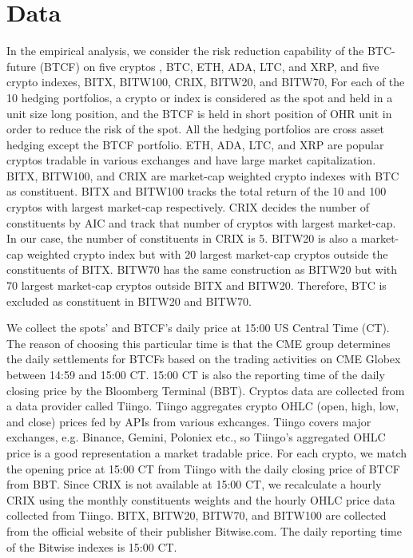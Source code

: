 \section{Data}\label{subsec:data}
In the empirical analysis, we consider the risk reduction capability of the BTC-future (BTCF) on five cryptos
, BTC, ETH, ADA, LTC, and XRP, and five crypto indexes, BITX, BITW100, CRIX, BITW20, and BITW70,
For each of the 10 hedging portfolios, a crypto or index is considered as the spot and held in a unit size long position,
and the BTCF is held in short position of OHR unit in order to reduce the risk of the spot.
All the hedging portfolios are cross asset hedging except the BTCF portfolio.
ETH, ADA, LTC, and XRP are popular cryptos tradable in various exchanges and have large market capitalization.
BITX, BITW100, and CRIX are market-cap weighted crypto indexes with BTC as constituent.
BITX and BITW100 tracks the total return of the 10 and 100 cryptos with largest market-cap respectively.
CRIX decides the number of constituents by AIC and track that number of cryptos with largest market-cap.
In our case, the number of constituents in CRIX is 5.
BITW20 is also a market-cap weighted crypto index but with 20 largest market-cap cryptos outside the constituents of
BITX.
BITW70 has the same construction as BITW20 but with 70 largest market-cap cryptos outside BITX and BITW20.
Therefore, BTC is excluded as constituent in BITW20 and BITW70. \medskip

We collect the spots' and BTCF's daily price at 15:00 US Central Time (CT).
The reason of choosing this particular time is that the CME group determines the daily settlements for BTCFs based on the trading activities on CME Globex between 14:59 and 15:00 CT.
15:00 CT is also the reporting time of the daily closing price by the Bloomberg Terminal (BBT).
Cryptos data are collected from a data provider called Tiingo.
Tiingo aggregates crypto OHLC (open, high, low, and close) prices fed by APIs from various exhcanges.
Tiingo covers major exchanges, e.g. Binance, Gemini, Poloniex etc., so Tiingo's aggregated OHLC price is a good representation a market tradable price.
For each crypto, we match the opening price at 15:00 CT from Tiingo with the daily closing price of BTCF from BBT.
Since CRIX is not available at 15:00 CT, we recalculate a hourly CRIX using the monthly constituents weights and the hourly OHLC price data collected from Tiingo.
BITX, BITW20, BITW70, and BITW100 are collected from the official website of their publisher Bitwise.com.
The daily reporting time of the Bitwise indexes is 15:00 CT. \medskip

